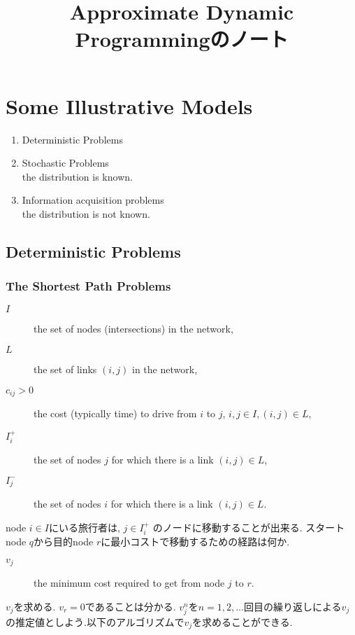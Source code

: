 \documentclass[11pt]{jsbook}
\title{Approximate Dynamic Programmingのノート}
\begin{document}
\maketitle
\chapter{}
\chapter{Some Illustrative Models}
\begin{enumerate}
	\item Deterministic Problems
	\item Stochastic Problems \\
		  the distribution is known.
	\item Information acquisition problems \\
		  the distribution is not known.
\end{enumerate}

\section{Deterministic Problems}
\subsection{The Shortest Path Problems}
\begin{description}
	\item[$I$] the set of nodes (intersections) in the network,
	\item[$L$] the set of links $(i,j)$ in the network,
	\item[$c_{ij} > 0$] the cost (typically time) to drive from $i$ to $j$, $i,j \in I, (i,j) \in L$,
	\item[$I_i^{+}$] the set of nodes $j$ for which there is a link $(i,j) \in L$,
	\item[$I_j^{-}$] the set of nodes $i$ for which there is a link $(i,j) \in L$.
\end{description}
node $i \in I$にいる旅行者は, $j \in I_i^{+}$ のノードに移動することが出来る.
スタートnode $q$から目的node $r$に最小コストで移動するための経路は何か.
\begin{description}
	\item[$v_j$] the minimum cost required to get from node $j$ to $r$.
\end{description}
$v_j$を求める. $v_r=0$であることは分かる.
$v_j^n$を$n=1,2,\dots$回目の繰り返しによる$v_j$の推定値としよう.以下のアルゴリズムで$v_j$を求めることができる.
\end{document}
